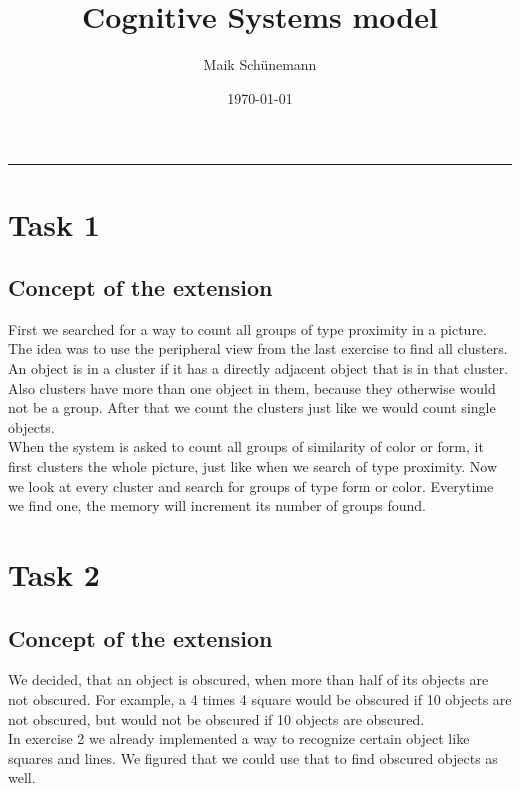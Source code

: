 \documentclass[11pt,a4paper,oneside]{scrartcl}
\author{Maik Schünemann}
\date{\today}
\title{Cognitive Systems model}
\begin{document}
\maketitle
\tableofcontents


\rule{\linewidth}{0.5pt}

\section{Task 1}
\subsection{Concept of the extension}
First we searched for a way to count all groups of type proximity in a picture. The idea was to use the peripheral view from the last exercise to find all clusters. An object is in a cluster if it has a directly adjacent object that is in that cluster. Also clusters have more than one object in them, because they otherwise would not be a group. After that we count the clusters just like we would count single objects.\\
When the system is asked to count all groups of similarity of color or form, it first clusters the whole picture, just like when we search of type proximity. Now we look at every cluster and search for groups of type form or color. Everytime we find one, the memory will increment its number of groups found.
\section{Task 2}
\subsection{Concept of the extension}
We decided, that an object is obscured, when more than half of its objects are not obscured. For example, a 4 times 4 square would be obscured if 10 objects are not obscured, but would not be obscured if 10 objects are obscured.\\
In exercise 2 we already implemented a way to recognize certain object like squares and lines. We figured that we could use that to find obscured objects as well.  
\end{document}
